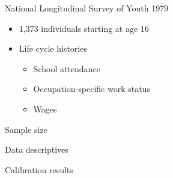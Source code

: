 \begin{frame}{National Longitudinal Survey of Youth 1979}\vspace{0.25cm}

	\begin{itemize}\setlength\itemsep{1em}
	\item 1,373 individuals starting at age 16
	\item Life cycle histories\medskip
	\begin{itemize}\setlength\itemsep{1em}
		\item School attendance
		\item Occupation-specific work status
		\item Wages
	\end{itemize}
\end{itemize}
\end{frame}
\begin{frame}{Sample size}
  \begin{figure}
  \end{figure}
\end{frame}
\begin{frame}{Data descriptives}
  \begin{figure}[h!]\centering
  \hspace{0.5cm}
  \end{figure}
\end{frame}
\begin{frame}{Calibration results}
  \begin{figure}[h!]\centering
  \hspace{0.5cm}
  \end{figure}
\end{frame}
